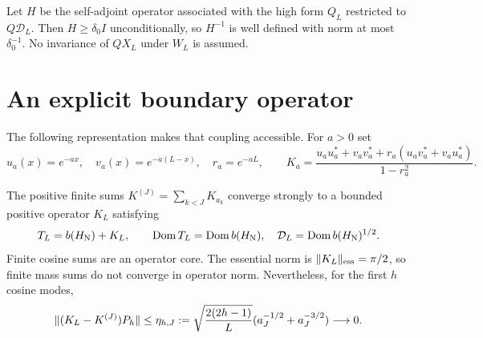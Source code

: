 Let $H$ be the self-adjoint operator associated with the high form
$Q_L$ restricted to $Q\mathcal D_L$. Then $H\ge\delta_0I$ unconditionally,
so $H^{-1}$ is well defined with norm at most $\delta_0^{-1}$.
No invariance of $QX_L$ under $W_L$ is assumed.

\section{An explicit boundary operator}
The following representation makes that coupling accessible. For $a>0$ set
\[
u_a(x)=e^{-ax},\quad v_a(x)=e^{-a(L-x)},\quad r_a=e^{-aL},\qquad
K_a=\frac{u_au_a^*+v_av_a^*+r_a(u_av_a^*+v_au_a^*)}{1-r_a^2}.
\]
\begin{theorem}\label{thm:boundary}
The positive finite sums $K^{(J)}=\sum_{k<J}K_{a_k}$ converge strongly to
a bounded positive operator $K_L$ satisfying
\begin{equation}\label{eq:boundary}
T_L=b(H_{\rm N})+K_L,\qquad
\operatorname{Dom} T_L=\operatorname{Dom} b(H_{\rm N}),\quad
\mathcal D_L=\operatorname{Dom} b(H_{\rm N})^{1/2}.
\end{equation}
Finite cosine sums are an operator core. The essential norm is
$\lVert K_L\rVert_{\rm ess}=\pi/2$, so finite mass sums do not converge in
operator norm. Nevertheless, for the first $h$ cosine modes,
\begin{equation}\label{eq:tail}
\lVert (K_L-K^{(J)})P_h\rVert\le
\eta_{h,J}:=\sqrt{\frac{2(2h-1)}L}
 (a_J^{-1/2}+a_J^{-3/2})\longrightarrow0.
\end{equation}
\end{theorem}
